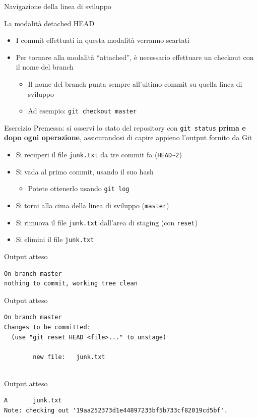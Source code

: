\documentclass[xcolor=dvipsnames,presentation]{beamer}
\begin{document}
\begin{frame}{Navigazione della linea di sviluppo}
\begin{block}{La modalità detached HEAD}
		\begin{itemize}
			\item I commit effettuati in questa modalità verranno scartati
			\item Per tornare alla modalità ``attached'', è necessario effettuare un checkout con il nome del branch
			\begin{itemize}
				\item Il nome del branch punta sempre all'ultimo commit su quella linea di sviluppo
				\item Ad esempio: \texttt{git checkout master}
			\end{itemize}
		\end{itemize}
	\end{block}
	\begin{block}{Esercizio}
		Premessa: si osservi lo stato del repository con \texttt{git status} \textbf{prima e dopo ogni operazione}, assicurandosi di capire appieno l'output fornito da Git
		\begin{itemize}
			\item Si recuperi il file \texttt{junk.txt} da tre commit fa (\texttt{HEAD\textasciitilde{}2})
			\item Si vada al primo commit, usando il suo hash
			\begin{itemize}
				\item Potete ottenerlo usando \texttt{git log}
			\end{itemize}
			\item Si torni alla cima della linea di sviluppo (\texttt{master})
			\item Si rimuova il file \texttt{junk.txt} dall'area di staging (con \texttt{reset})
			\item Si elimini il file \texttt{junk.txt}
		\end{itemize}
	\end{block}
	\begin{block}{Output atteso}
		\begin{Verbatim}[fontsize=\scriptsize]
On branch master
nothing to commit, working tree clean
		\end{Verbatim}
	\end{block}
	\begin{block}{Output atteso}
		\begin{Verbatim}[fontsize=\scriptsize]
On branch master
Changes to be committed:
  (use "git reset HEAD <file>..." to unstage)

        new file:   junk.txt


		\end{Verbatim}
	\end{block}
	\begin{block}{Output atteso}
		\begin{Verbatim}[fontsize=\scriptsize]
A       junk.txt
Note: checking out '19aa252373d1e44897233bf5b733cf82019cd5bf'.


\end{Verbatim}
\end{block}
\end{frame}
\end{document}

